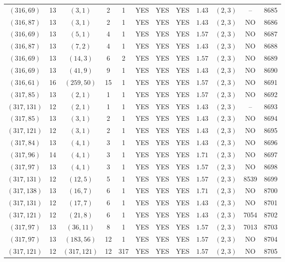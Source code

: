 \begin{longtable}{|c|c|c|c|c|c|c|c|c|c|c|c|}
$(316,69)$ & 13 & $(3,1)$ & 2 & 1 & YES & YES & YES & $1.43$ & $(2,3)$ & -- & 8685\\
$(316,87)$ & 13 & $(3,1)$ & 2 & 1 & YES & YES & YES & $1.43$ & $(2,3)$ & NO & 8686\\
$(316,69)$ & 13 & $(5,1)$ & 4 & 1 & YES & YES & YES & $1.57$ & $(2,3)$ & NO & 8687\\
$(316,87)$ & 13 & $(7,2)$ & 4 & 1 & YES & YES & YES & $1.43$ & $(2,3)$ & NO & 8688\\
$(316,69)$ & 13 & $(14,3)$ & 6 & 2 & YES & YES & YES & $1.57$ & $(2,3)$ & NO & 8689\\
$(316,69)$ & 13 & $(41,9)$ & 9 & 1 & YES & YES & YES & $1.43$ & $(2,3)$ & NO & 8690\\
$(316,61)$ & 16 & $(259,50)$ & 15 & 1 & YES & YES & YES & $1.57$ & $(2,3)$ & NO & 8691\\
$(317,85)$ & 13 & $(2,1)$ & 1 & 1 & YES & YES & YES & $1.57$ & $(2,3)$ & NO & 8692\\
$(317,131)$ & 12 & $(2,1)$ & 1 & 1 & YES & YES & YES & $1.43$ & $(2,3)$ & -- & 8693\\
$(317,85)$ & 13 & $(3,1)$ & 2 & 1 & YES & YES & YES & $1.43$ & $(2,3)$ & NO & 8694\\
$(317,121)$ & 12 & $(3,1)$ & 2 & 1 & YES & YES & YES & $1.43$ & $(2,3)$ & NO & 8695\\
$(317,84)$ & 13 & $(4,1)$ & 3 & 1 & YES & YES & YES & $1.43$ & $(2,3)$ & NO & 8696\\
$(317,96)$ & 14 & $(4,1)$ & 3 & 1 & YES & YES & YES & $1.71$ & $(2,3)$ & NO & 8697\\
$(317,97)$ & 13 & $(4,1)$ & 3 & 1 & YES & YES & YES & $1.57$ & $(2,3)$ & NO & 8698\\
$(317,131)$ & 12 & $(12,5)$ & 5 & 1 & YES & YES & YES & $1.57$ & $(2,3)$ & 8539 & 8699\\
$(317,138)$ & 13 & $(16,7)$ & 6 & 1 & YES & YES & YES & $1.71$ & $(2,3)$ & NO & 8700\\
$(317,131)$ & 12 & $(17,7)$ & 6 & 1 & YES & YES & YES & $1.43$ & $(2,3)$ & NO & 8701\\
$(317,121)$ & 12 & $(21,8)$ & 6 & 1 & YES & YES & YES & $1.43$ & $(2,3)$ & 7054 & 8702\\
$(317,97)$ & 13 & $(36,11)$ & 8 & 1 & YES & YES & YES & $1.57$ & $(2,3)$ & 7013 & 8703\\
$(317,97)$ & 13 & $(183,56)$ & 12 & 1 & YES & YES & YES & $1.57$ & $(2,3)$ & NO & 8704\\
$(317,121)$ & 12 & $(317,121)$ & 12 & 317 & YES & YES & YES & $1.57$ & $(2,3)$ & NO & 8705\\

\end{longtable}
